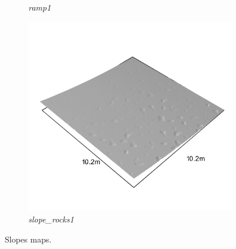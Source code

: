 \documentclass[../document.tex]{subfiles}
\begin{document}
\begin{figure}[H]
\begin{subfigure}[b]{0.23\linewidth}
            \caption{\emph{ramp1}}
            \end{subfigure}    
          \begin{subfigure}[b]{0.23\textwidth}
            \includegraphics[width=\textwidth]{../img/hm3d_borders/slope_rocks1.png}
            \caption{\emph{slope\_rocks1}}
        \end{subfigure}    
    \caption{Slopes maps.}
\end{figure}
\end{document}

